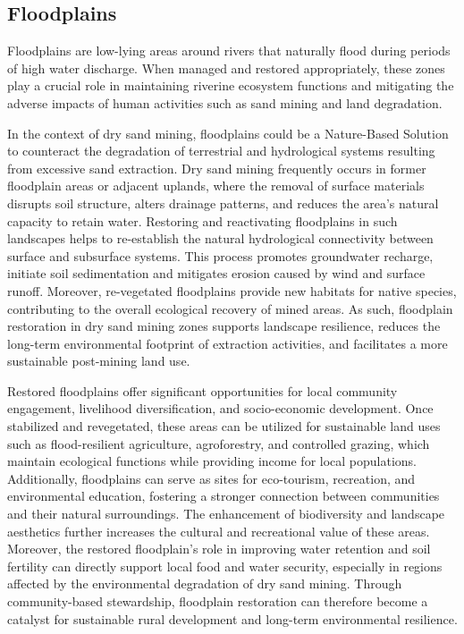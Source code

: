 \subsection{Floodplains}

Floodplains are low-lying areas around rivers that naturally flood during periods of high water discharge. When managed and restored appropriately, these zones play a crucial role in maintaining riverine ecosystem functions and mitigating the adverse impacts of human activities such as sand mining and land degradation.

In the context of dry sand mining, floodplains could be a Nature-Based Solution to counteract the degradation of terrestrial and hydrological systems resulting from excessive sand extraction. Dry sand mining frequently occurs in former floodplain areas or adjacent uplands, where the removal of surface materials disrupts soil structure, alters drainage patterns, and reduces the area’s natural capacity to retain water. Restoring and reactivating floodplains in such landscapes helps to re-establish the natural hydrological connectivity between surface and subsurface systems. This process promotes groundwater recharge, initiate soil sedimentation and mitigates erosion caused by wind and surface runoff. Moreover, re-vegetated floodplains provide new habitats for native species, contributing to the overall ecological recovery of mined areas. As such, floodplain restoration in dry sand mining zones supports landscape resilience, reduces the long-term environmental footprint of extraction activities, and facilitates a more sustainable post-mining land use.

Restored floodplains offer significant opportunities for local community engagement, livelihood diversification, and socio-economic development. Once stabilized and revegetated, these areas can be utilized for sustainable land uses such as flood-resilient agriculture, agroforestry, and controlled grazing, which maintain ecological functions while providing income for local populations. Additionally, floodplains can serve as sites for eco-tourism, recreation, and environmental education, fostering a stronger connection between communities and their natural surroundings. The enhancement of biodiversity and landscape aesthetics further increases the cultural and recreational value of these areas. Moreover, the restored floodplain’s role in improving water retention and soil fertility can directly support local food and water security, especially in regions affected by the environmental degradation of dry sand mining. Through community-based stewardship, floodplain restoration can therefore become a catalyst for sustainable rural development and long-term environmental resilience.

